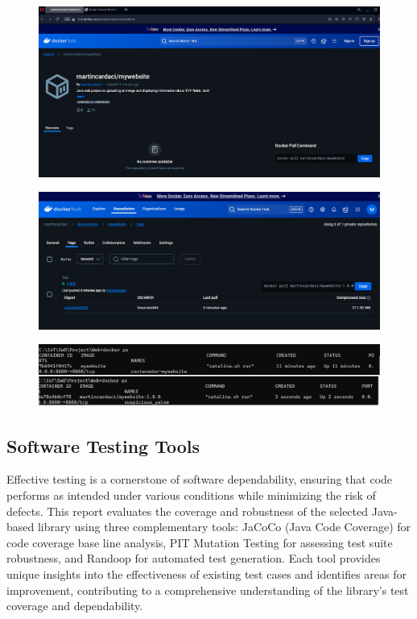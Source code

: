 \documentclass[sigconf]{acmart}
\begin{document}
\begin{figure}[H]
    \centering
    \includegraphics[width=1\linewidth]{dockerhub1.png}
    \caption{}
    \label{fig:enter-label}
\end{figure}
\begin{figure}[H]
    \centering
    \includegraphics[width=1\linewidth]{dockerhub2.png}
    \caption{}
    \label{fig:enter-label}
\end{figure}
\begin{figure}[H]
    \centering
    \includegraphics[width=1\linewidth]{dockerPS.png}
    \caption{}
    \label{fig:enter-label}
\end{figure}







\subsection{Software Testing Tools}

Effective testing is a cornerstone of software dependability, ensuring that code performs as intended under various conditions while minimizing the risk of defects. This report evaluates the coverage and robustness of the selected Java-based library using three complementary tools: JaCoCo\cite{jacoco} (Java Code Coverage) for code coverage base line analysis, PIT Mutation Testing \cite{pitest} for assessing test suite robustness, and Randoop\cite{randoop} for automated test generation. Each tool provides unique insights into the effectiveness of existing test cases and identifies areas for improvement, contributing to a comprehensive understanding of the library’s test coverage and dependability.
\end{document}
